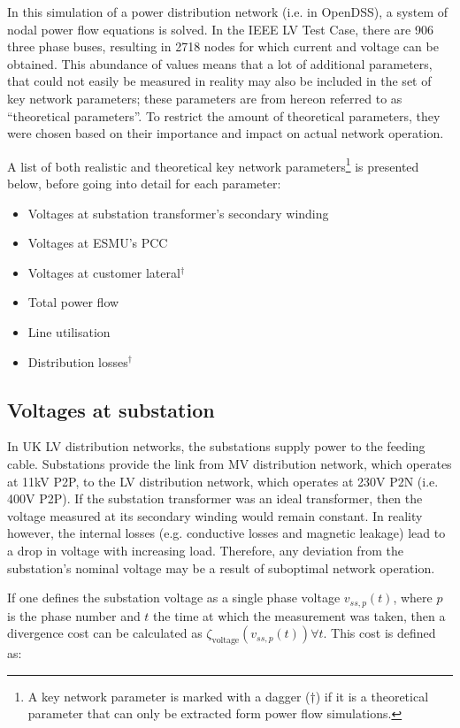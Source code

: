In this simulation of a power distribution network (i.e. in OpenDSS), a system of nodal power flow equations is solved.
In the IEEE LV Test Case, there are 906 three phase buses, resulting in 2718 nodes for which current and voltage can be obtained.
This abundance of values means that a lot of additional parameters, that could not easily be measured in reality may also be included in the set of key network parameters; these parameters are from hereon referred to as ``theoretical parameters''.
To restrict the amount of theoretical parameters, they were chosen based on their importance and impact on actual network operation.

A list of both realistic and theoretical key network parameters\footnote{A key network parameter is marked with a dagger ($\dagger$) if it is a theoretical parameter that can only be extracted form power flow simulations.} is presented below, before going into detail for each parameter:

\begin{itemize}
	\item Voltages at substation transformer's secondary winding
	\item Voltages at ESMU's PCC
	\item Voltages at customer lateral$^{\dagger}$
	\item Total power flow
	\item Line utilisation
	\item Distribution losses$^{\dagger}$
\end{itemize}

\subsection{Voltages at substation}
\label{ch1:subsec:voltages-at-substation}

In UK LV distribution networks, the substations supply power to the feeding cable.
Substations provide the link from MV distribution network, which operates at 11kV P2P, to the LV distribution network, which operates at 230V P2N (i.e. 400V P2P).
If the substation transformer was an ideal transformer, then the voltage measured at its secondary winding would remain constant.
In reality however, the internal losses (e.g. conductive losses and magnetic leakage) lead to a drop in voltage with increasing load.
Therefore, any deviation from the substation's nominal voltage may be a result of suboptimal network operation.

If one defines the substation voltage as a single phase voltage $v_{ss,p}(t)$, where $p$ is the phase number and $t$ the time at which the measurement was taken, then a divergence cost can be calculated as $\zeta_\text{voltage}(v_{ss,p}(t)) \forall t$.
This cost is defined as:

